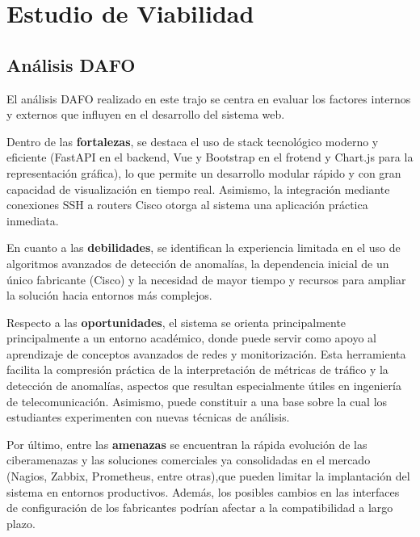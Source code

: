 
\chapter{Estudio de Viabilidad}
\section{Análisis DAFO}

El análisis DAFO realizado en este trajo se centra en evaluar los factores internos y externos que influyen en el desarrollo del sistema web.

Dentro de las \textbf{fortalezas}, se destaca el uso de stack tecnológico moderno y eficiente (FastAPI en el backend, Vue y Bootstrap en el frotend y Chart.js para la representación gráfica), lo que permite un desarrollo modular rápido y con gran capacidad de visualización en tiempo real. Asimismo, la integración mediante conexiones SSH a routers Cisco otorga al sistema una aplicación práctica inmediata.

En cuanto a las \textbf{debilidades}, se identifican la experiencia limitada en el uso de algoritmos avanzados de detección de anomalías, la dependencia inicial de un único fabricante (Cisco) y la necesidad de mayor tiempo y recursos para ampliar la solución hacia entornos más complejos.

Respecto a las \textbf{oportunidades}, el sistema se orienta principalmente principalmente a un entorno académico, donde puede servir como apoyo al aprendizaje de conceptos avanzados de redes y monitorización. Esta herramienta facilita la compresión práctica de la interpretación de métricas de tráfico y la detección de anomalías, aspectos que resultan especialmente útiles en ingeniería de telecomunicación. Asimismo, puede constituir a una base sobre la cual los estudiantes experimenten con nuevas técnicas de análisis.

Por último, entre las \textbf{amenazas} se encuentran la rápida evolución de las ciberamenazas y las soluciones comerciales ya consolidadas en el mercado (Nagios, Zabbix, Prometheus, entre otras),que pueden limitar la implantación del sistema en entornos productivos. Además, los posibles cambios en las interfaces de configuración de los fabricantes podrían afectar a la compatibilidad a largo plazo.

